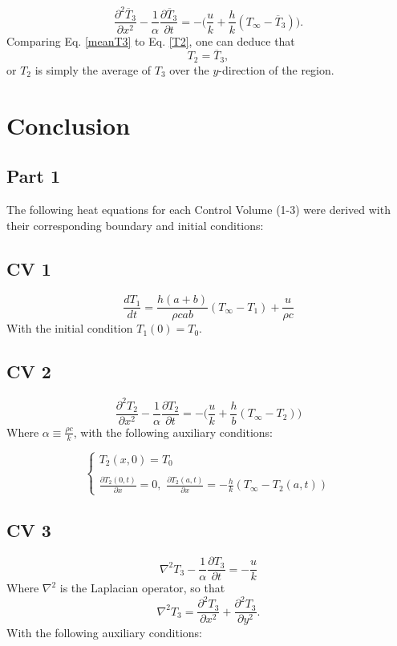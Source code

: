 \documentclass{article}
\newcommand{\dTdt}{\frac{\partial T_2}{\partial t}}
\newcommand{\dTdx}{\frac{\partial^2 T_2}{\partial x^2}}
\newcommand{\dTTdt}{\frac{\partial T_3}{\partial t}}
\newcommand{\dTTdx}{\frac{\partial^2 T_3}{\partial x^2}}
\newcommand{\dTTdy}{\frac{\partial^2 T_3}{\partial y^2}}
\begin{document}
\begin{equation}
    \frac{\partial^2 \overline{T}_3}{\partial x^2} - \frac{1}{\alpha} \frac{\partial \overline{T}_3}{\partial t} = -\bigg(\frac{u}{k} + \frac{h}{k}(T_\infty - \overline{T}_3)\bigg).
    \label{meanT3}
\end{equation}
Comparing Eq. \eqref{meanT3} to Eq. \eqref{T2}, one can deduce that 
\begin{equation}
    T_2 = \overline{T}_3,
\end{equation}
or $T_2$ is simply the average of $T_3$ over the $y$-direction of the region.

\section{Conclusion}
\subsection*{Part 1}
The following heat equations for each Control Volume (1-3) were derived with their corresponding boundary and initial conditions:
\subsection*{CV 1}
\begin{equation}
    \frac{dT_1}{dt} = \frac{h(a+b)}{\rho c ab} (T_\infty - T_1) + \frac{u}{\rho c}
\end{equation}
With the initial condition $T_1(0) = T_0$.
\subsection*{CV 2}
\begin{equation}
    \dTdx - \frac{1}{\alpha} \dTdt = -\bigg(\frac{u}{k} + \frac{h}{b}(T_\infty - T_2)\bigg)
    \label{T2}
\end{equation}
Where $\alpha \equiv \frac{\rho c}{k}$, with the following auxiliary conditions:

\begin{equation}
    \begin{cases}
    T_2(x,0) = T_0 \\
    \\
    \frac{\partial T_2(0,t)}{\partial x} = 0, \, \, \frac{\partial T_2(a,t)}{\partial x} = -\frac{h}{k}(T_\infty - T_2(a,t))
    \end{cases}
\end{equation}
\subsection*{CV 3}
\begin{equation}
    \nabla^2 T_3 - \frac{1}{\alpha} \dTTdt = -\frac{u}{k}
\end{equation}
Where $\nabla^2$ is the Laplacian operator, so that
\begin{equation}
    \nabla^2 T_3 = \dTTdx + \dTTdy.
\end{equation}
With the following auxiliary conditions:
\end{document}
